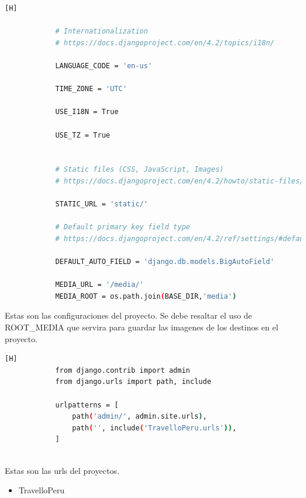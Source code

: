 \documentclass{article}
\begin{document}
\begin{lstlisting}[language=bash,caption={urls.py}][H]
            
            # Internationalization
            # https://docs.djangoproject.com/en/4.2/topics/i18n/
            
            LANGUAGE_CODE = 'en-us'
            
            TIME_ZONE = 'UTC'
            
            USE_I18N = True
            
            USE_TZ = True
            
            
            # Static files (CSS, JavaScript, Images)
            # https://docs.djangoproject.com/en/4.2/howto/static-files/
            
            STATIC_URL = 'static/'
            
            # Default primary key field type
            # https://docs.djangoproject.com/en/4.2/ref/settings/#default-auto-field
            
            DEFAULT_AUTO_FIELD = 'django.db.models.BigAutoField'
            
            MEDIA_URL = '/media/'
            MEDIA_ROOT = os.path.join(BASE_DIR,'media')
    	\end{lstlisting}
     
            Estas son las configuraciones del proyecto. Se debe resaltar el uso de ROOT_MEDIA que servira para guardar las imagenes de los destinos en el proyecto.
        
            \begin{lstlisting}[language=bash,caption={urls.py}][H] 
            from django.contrib import admin
            from django.urls import path, include
            
            urlpatterns = [
                path('admin/', admin.site.urls),
                path('', include('TravelloPeru.urls')),
            ]
            
    	\end{lstlisting}
     
            Estas son las urls del proyectos.

    	\begin{itemize}	
    		\item TravelloPeru
    	\end{itemize}
     
\end{document}
